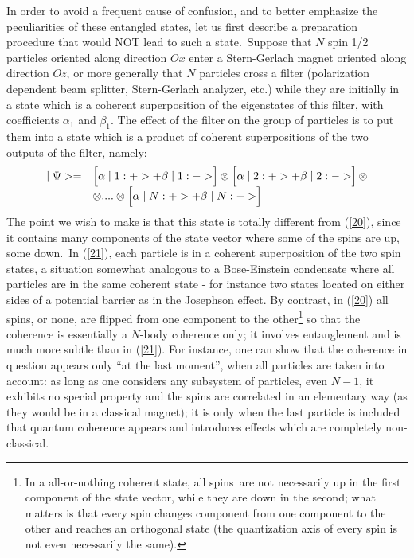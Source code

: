 \documentclass[12pt,onecolumn]{article}%
\begin{document}
In order to avoid a frequent cause of confusion, and to better emphasize the
peculiarities of these entangled states, let us first describe a preparation
procedure that would NOT lead to such a state.\ Suppose that $N$ spin 1/2
particles oriented along direction $Ox$ enter a Stern-Gerlach magnet oriented
along direction $Oz$, or more generally that $N$ particles cross a filter
(polarization dependent beam splitter, Stern-Gerlach analyzer, etc.) while
they are initially in a state which is a coherent superposition of the
eigenstates of this filter, with coefficients $\alpha_{1}$ and $\beta_{1}$.
The effect of the filter on the group of particles is to put them into a state
which is a product of coherent superpositions of the two outputs of the
filter, namely:%
\begin{equation}%
\begin{array}
[c]{cl}%
\mid\Psi>= & \left[  \alpha\mid1:+>+\beta\mid\overset{}{1}:->\right]
\otimes\left[  \alpha\mid2:+>+\beta\mid\overset{}{2}:->\right]  \otimes\\
& \otimes....\otimes\left[  \alpha\mid N:+>+\beta\mid\overset{}{N}:->\right]
\end{array}
\label{21}%
\end{equation}
The point we wish to make is that this state is totally different from
(\ref{20}), since it contains many components of the state vector where some
of the spins are up, some down.\ In (\ref{21}), each particle is in a coherent
superposition of the two spin states, a situation somewhat analogous to a
Bose-Einstein condensate where all particles are in the same coherent state -
for instance two states located on either sides of a potential barrier as in
the Josephson effect. By contrast, in (\ref{20}) all spins, or none, are
flipped from one component to the other\footnote{In a all-or-nothing coherent
state, all spins\ are not necessarily up in the first component of the state
vector, while they are down in the second; what matters is that every spin
changes component from one component to the other and reaches an orthogonal
state (the quantization axis of every spin is not even necessarily the same).}
so that the coherence is essentially a $N$-body coherence only; it involves
entanglement and is much more subtle than in (\ref{21}). For instance, one can
show \cite{FL2} that the coherence in question appears only ``at the last
moment'', when all particles are taken into account: as long as one considers
any subsystem of particles, even $N-1$, it exhibits no special property and
the spins are correlated in an elementary way (as they would be in a classical
magnet); it is only when the last particle is included that quantum coherence
appears and introduces effects which are completely non-classical.
\end{document}
